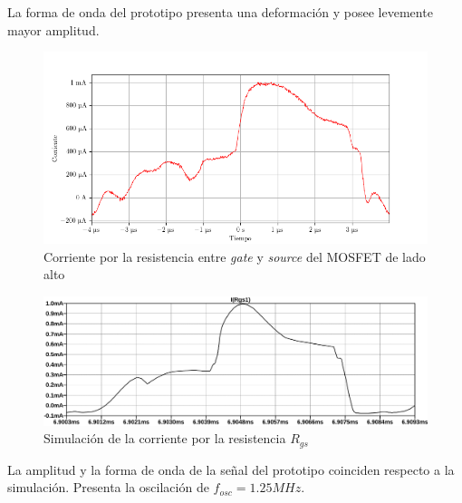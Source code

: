 La forma de onda del prototipo presenta una deformación y posee levemente mayor amplitud. 

\begin{figure}[H]
    \centering
    \includegraphics[width=\textwidth]{images/capturas-osciloscopio/17-11-2022/13.png}
    \caption{Corriente por la resistencia entre \textit{gate} y \textit{source} del MOSFET de lado alto}
    \label{fig:osc:13}
\end{figure}

\begin{figure}[H]
    \centering
    \includegraphics[width=\textwidth]{images/sim/7.pdf}
    \caption{Simulación de la corriente por la resistencia $R_{gs}$}
    \label{fig:sim:7}
\end{figure}

La amplitud y la forma de onda de la señal del prototipo coinciden respecto a la simulación. 
Presenta la oscilación de $f_{osc}=1.25MHz$. 






